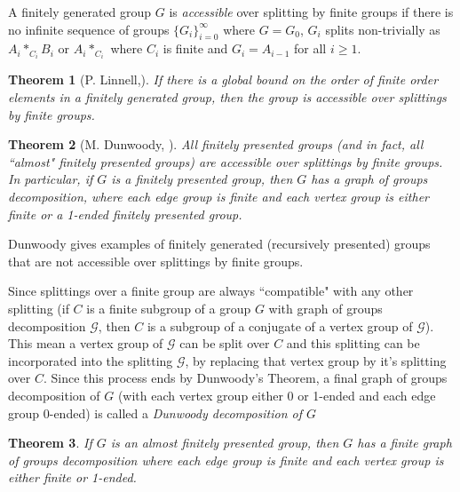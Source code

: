 \documentclass[12pt]{article}
\newtheorem{theorem}{Theorem}[subsection]
\begin{document}
 A finitely generated group $G$ is {\it accessible} over splitting by finite groups if there is no infinite sequence of groups $\{G_i\}_{i=0}^\infty$ where $G=G_0$, $G_i$ splits non-trivially as $A_i\ast_{C_i} B_i$ or $A_i\ast_{C_i}$ where $C_i$ is finite and $G_i=A_{i-1}$ for all $i\geq 1$.
 
 \begin{theorem} [P. Linnell,\cite{Linn83}] \label{LinnAcc} 
 If there is a global bound on the order of finite order elements in a finitely generated group, then the group is accessible over splittings by finite groups. 

 \end{theorem}
 
\begin{theorem} [M. Dunwoody, \cite{Dun85}]  \label{DunAcc} 
All finitely presented groups (and in fact, all ``almost" finitely presented groups) are accessible over splittings by finite groups. In particular, if $G$ is a finitely presented group, then $G$ has a graph of groups decomposition, where each edge group is finite and each vertex group is either finite or a 1-ended finitely presented group. 
\end{theorem} 

 Dunwoody \cite{Dun93} gives examples of finitely generated (recursively presented) groups that are not accessible over splittings by finite groups. 
 
Since splittings over a finite group are always ``compatible" with any other splitting (if $C$ is a finite subgroup of a group $G$ with graph of groups decomposition $\mathcal G$, then $C$ is a subgroup of a conjugate of a vertex group of $\mathcal G$). This mean a vertex group of $\mathcal G$ can be split over $C$ and this splitting can be incorporated into the splitting $\mathcal G$, by replacing that vertex group by it's splitting over $C$. Since this process ends by Dunwoody's Theorem, a final graph of groups decomposition of $G$ (with each vertex group either 0 or 1-ended and each edge group 0-ended) is called a {\it Dunwoody decomposition of $G$}

\begin{theorem} If $G$ is an almost finitely presented group, then $G$ has a finite graph of groups decomposition where each edge group is finite and each vertex group is either finite or 1-ended. 
\end{theorem}
\end{document}
